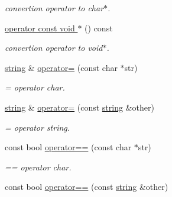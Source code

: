 \begin{DoxyCompactItemize}
\begin{DoxyCompactList}\small\item\em convertion operator to char$\ast$. \end{DoxyCompactList}\item 
\hyperlink{class_ensum_1_1string_a6fa9ce4490f285575c2d06a1e64a93a7}{operator const void $\ast$} () const \hypertarget{class_ensum_1_1string_a6fa9ce4490f285575c2d06a1e64a93a7}{}\label{class_ensum_1_1string_a6fa9ce4490f285575c2d06a1e64a93a7}

\begin{DoxyCompactList}\small\item\em convertion operator to void$\ast$. \end{DoxyCompactList}\item 
\hyperlink{class_ensum_1_1string}{string} \& \hyperlink{class_ensum_1_1string_ae48b8f643d8cd3ff379a51484ea738d1}{operator=} (const char $\ast$str)\hypertarget{class_ensum_1_1string_ae48b8f643d8cd3ff379a51484ea738d1}{}\label{class_ensum_1_1string_ae48b8f643d8cd3ff379a51484ea738d1}

\begin{DoxyCompactList}\small\item\em = operator char. \end{DoxyCompactList}\item 
\hyperlink{class_ensum_1_1string}{string} \& \hyperlink{class_ensum_1_1string_a7903e871b1cf12584d746536241fa7ea}{operator=} (const \hyperlink{class_ensum_1_1string}{string} \&other)\hypertarget{class_ensum_1_1string_a7903e871b1cf12584d746536241fa7ea}{}\label{class_ensum_1_1string_a7903e871b1cf12584d746536241fa7ea}

\begin{DoxyCompactList}\small\item\em = operator string. \end{DoxyCompactList}\item 
const bool \hyperlink{class_ensum_1_1string_a6b5ab08eb5ef197bedb9e55e2eca0754}{operator==} (const char $\ast$str)\hypertarget{class_ensum_1_1string_a6b5ab08eb5ef197bedb9e55e2eca0754}{}\label{class_ensum_1_1string_a6b5ab08eb5ef197bedb9e55e2eca0754}

\begin{DoxyCompactList}\small\item\em == operator char. \end{DoxyCompactList}\item 
const bool \hyperlink{class_ensum_1_1string_a6429683caad1908c30cb77b4aa00ff4f}{operator==} (const \hyperlink{class_ensum_1_1string}{string} \&other)\hypertarget{class_ensum_1_1string_a6429683caad1908c30cb77b4aa00ff4f}{}\label{class_ensum_1_1string_a6429683caad1908c30cb77b4aa00ff4f}


\end{DoxyCompactItemize}
